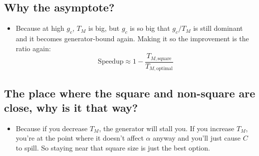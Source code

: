 \documentclass[11pt, a4paper]{article}
\begin{document}
\subsection*{Why the asymptote?}
\begin{itemize}
    \item Because at high $g_c$, $T_M$ is big, but $g_c$ is so big that $g_c / T_M$ is still dominant and it becomes generator-bound again. Making it so the improvement is the ratio again:
    \[
      \text{Speedup} \approx 1 - \frac{T_{M,\text{square}}}{T_{M,\text{optimal}}}
    \]
\end{itemize}

\subsection*{The place where the square and non-square are close, why is it that way?}
\begin{itemize}
    \item Because if you decrease $T_M$, the generator will stall you. If you increase $T_M$, you're at the point where it doesn't affect $\alpha$ anyway and you'll just cause $C$ to spill. So staying near that square size is just the best option.
\end{itemize}
\end{document}
